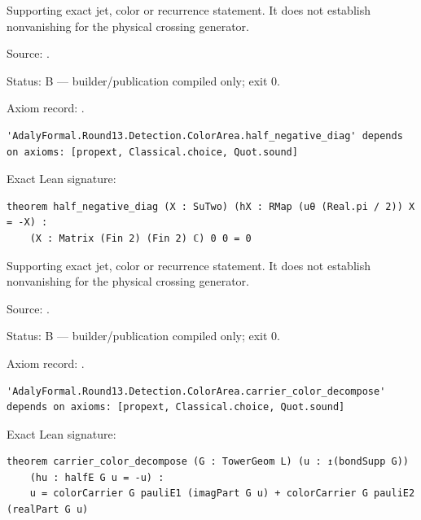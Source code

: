 \begin{theorem}[bp-534]
\label{bp-534}
\uses{}
\leanok
Supporting exact jet, color or recurrence statement. It does not establish nonvanishing for the physical crossing generator.

\par Source: \texttt{}.
\par Status: B — builder/publication compiled only; exit 0.
\par Axiom record: \texttt{}.
\begin{verbatim}
'AdalyFormal.Round13.Detection.ColorArea.half_negative_diag' depends on axioms: [propext, Classical.choice, Quot.sound]
\end{verbatim}
\par Exact Lean signature:
\begin{verbatim}
theorem half_negative_diag (X : SuTwo) (hX : RMap (uθ (Real.pi / 2)) X = -X) :
    (X : Matrix (Fin 2) (Fin 2) ℂ) 0 0 = 0
\end{verbatim}
\end{theorem}

\begin{theorem}[bp-535]
\label{bp-535}
\leanok
Supporting exact jet, color or recurrence statement. It does not establish nonvanishing for the physical crossing generator.

\par Source: \texttt{}.
\par Status: B — builder/publication compiled only; exit 0.
\par Axiom record: \texttt{}.
\begin{verbatim}
'AdalyFormal.Round13.Detection.ColorArea.carrier_color_decompose' depends on axioms: [propext, Classical.choice, Quot.sound]
\end{verbatim}
\par Exact Lean signature:
\begin{verbatim}
theorem carrier_color_decompose (G : TowerGeom L) (u : ↥(bondSupp G))
    (hu : halfE G u = -u) :
    u = colorCarrier G pauliE1 (imagPart G u) + colorCarrier G pauliE2 (realPart G u)
\end{verbatim}
\end{theorem}

